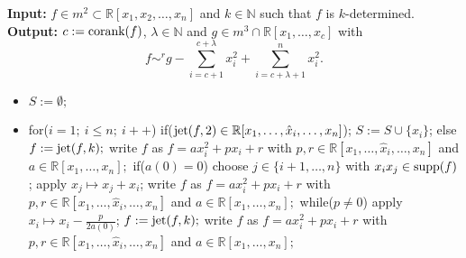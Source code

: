\documentclass{amsproc}
\begin{document}
\begin{AlgorithmSplittingLemma} \label{AlgorithmSplittingLemma} \end{AlgorithmSplittingLemma}
\noindent\textnormal{\bf Input:} $f\in m^2\subset\mathbb R[x_1,x_2,\ldots,x_n]$ and $k\in\mathbb N$ such that $f$ is $k$-determined.\newline
\textnormal{\bf Output:} $c:=\textnormal{corank}(f)$, $\lambda\in\mathbb N$ and
$g\in m^3\cap\mathbb R[x_1,\ldots,x_c]$ with \[\displaystyle f\sim^rg-\sum_{i=c+1}^{c+\lambda} x_i^2+\sum_{i=c+\lambda+1}^nx_i^2.\]
\begin{itemize}
\item $S:=\emptyset;$
\item for($i=1;\ i\le n;\  i++$)\newline
\phantom{}\quad if($\textnormal{jet}(f,2)\in \mathbb R[x_1,\ldots,\hat x_i,\ldots,x_n]$);\newline
\phantom{}\quad\quad $S:=S\cup\{x_i\}$;\newline
\phantom{}\quad else\newline
\phantom{}\quad\quad $f:=\textnormal{jet}(f,k);$\newline
\phantom{}\quad\quad write $f$ as $f=ax_i^2+px_i+r$ with $p,r\in\mathbb R[x_1,\ldots,\hat x_i,\ldots,x_n]$\newline
\phantom{}\quad\quad and $a\in\mathbb R[x_1,\ldots,x_n];$\newline
\phantom{}\quad\quad if($a(0)=0$)\newline
\phantom{}\quad\quad\quad choose $j\in\{i+1,\ldots,n\}$ with $x_ix_j\in\textnormal{supp}(f)$;\newline
\phantom{}\quad\quad\quad apply $x_j\mapsto x_j+x_i$;\newline
\phantom{}\quad\quad\quad write $f$ as $f=ax_i^2+px_i+r$ with $p,r\in\mathbb R[x_1,\ldots,\hat x_i,\ldots,x_n]$\newline
\phantom{}\quad\quad\quad and $a\in\mathbb R[x_1,\ldots,x_n];$\newline
\phantom{}\quad\quad\quad\quad while($p\neq 0$)\newline
\phantom{}\quad\quad\quad\quad\quad apply $x_i\mapsto x_i-\frac{p}{2a(0)}$;\newline
\phantom{}\quad\quad\quad\quad\quad $f:=\textnormal{jet}(f,k);$\newline
\phantom{}\quad\quad\quad\quad\quad write $f$ as $f=ax_i^2+px_i+r$ with $p,r\in\mathbb R[x_1,\ldots,\hat x_i,\ldots,x_n]$\newline
\phantom{}\quad\quad\quad\quad\quad and $a\in\mathbb R[x_1,\ldots,x_n];$\newline

\end{itemize}
\end{document}
